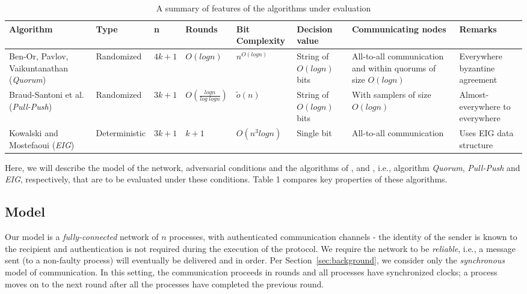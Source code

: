 \begin{table*}[t]
    \caption{A summary of features of the algorithms under evaluation}
    \scriptsize
        \setlength{\tabcolsep}{3pt}
    \begin{tabular}{p{1.5cm}llp{1.4cm}p{1.3cm}p{1.2cm}p{1.4cm}p{1.2cm}}
\hline
\textbf{Algorithm} & \textbf{Type} &\textbf{n} & \textbf{Rounds} & \textbf{Bit Complexity } &\textbf{Decision value} & \textbf{Commun\-icating nodes}& \textbf{Remarks} \\ \hline
Ben-Or, Pavlov, Vaikuntanathan \cite{BPV06} (\textit{Quorum})& Randomized & $4k + 1$ & $O(logn)$ & $n^{O(logn)}$      &String of $O(logn)$ bits &All-to-all communication and within quorums of size $O(logn)$   & Everywhere byzantine agreement     \\
          Braud-Santoni et al. \cite{BGH13} (\textit{Pull-Push}) & Randomized & $3k + 1$ & $O(\frac{logn}{log\; log n})$ & $\tilde{o}(n)$      &String of $O(logn)$ bits &With samplers of size $O(logn)$  & Almost-everywhere to everywhere     \\
                Kowalski and Mostefaoui \cite{KM13} (\textit{EIG}) & Deterministic & $3k + 1$     & $k + 1$                     & $O(n^3logn)$ &Single bit  &All-to-all communication & Uses EIG data structure\\ \hline
%
\end{tabular}
\end{table*}
Here, we will describe the model of the network, adversarial conditions and the algorithms of \cite{BPV06}, \cite{BGH13} and \cite{KM13}, i.e., algorithm \textit{Quorum}, \textit{Pull-Push} and \textit{EIG}, respectively, that are to be evaluated under these conditions. Table 1 compares key properties of these algorithms.


\subsection{Model}
Our model is a \textit{fully-connected} network of $n$ processes, with authenticated communication channels - the identity of the sender is known to the recipient and authentication is not required during the execution of the protocol. We require the network to be \textit{reliable}, i.e., a message sent (to a non-faulty process) will eventually be delivered and in order. Per Section~\ref{sec:background}, we consider only the \textit{synchronous} model of communication. In this setting, the communication proceeds in rounds and all processes have synchronized clocks; a process moves on to the next round after all the processes have completed the previous round. %


